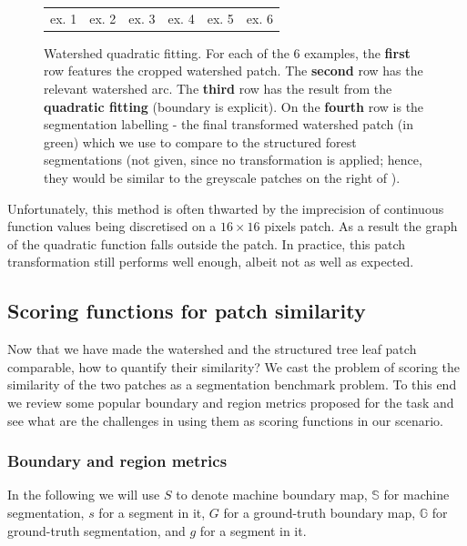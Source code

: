 \begin{figure}[ht!]
\begin{center}
\begin{tabular}{ c c c c c c }
  ex. 1 & ex. 2 & ex. 3 & ex. 4 & ex. 5 & ex. 6 \\
  \end{tabular}
\end{center}
\caption[Watershed quadratic fitting]{Watershed quadratic fitting. For each of the 6 examples, the {\bf first} row features the cropped watershed patch. The {\bf second} row has the relevant watershed arc. The {\bf third} row has the result from the {\bf quadratic fitting} (boundary is explicit). On the {\bf fourth} row is the segmentation labelling - the final transformed watershed patch (in green) which we use to compare to the structured forest segmentations (not given, since no transformation is applied; hence, they would be similar to the greyscale patches on the right of ).}
\label{fig:ws-quadratic-fitting}
\end{figure}

Unfortunately, this method is often thwarted by the imprecision of continuous function values being discretised on a $16\times 16$ pixels patch. %
As a result the graph of the quadratic function falls outside the patch. In practice, this patch transformation still performs well enough, albeit not as well as expected.

\subsection{Scoring functions for patch similarity}
Now that we have made the watershed and the structured tree leaf patch comparable, how to quantify their similarity? 
We cast the problem of scoring the similarity of the two patches as a segmentation benchmark problem. To this end we review some popular boundary and region metrics proposed for the task and see what are the challenges in using them as scoring functions in our scenario.

\subsubsection{Boundary and region metrics}
\label{sec:ch4-boundary-and-region-metrics-maths}
In the following we will use $S$ to denote machine boundary map, $\mathbb{S}$ for machine segmentation, $s$ for a segment in it, $G$ for a ground-truth boundary map, $\mathbb{G}$ for ground-truth segmentation, and $g$ for a segment in it.


